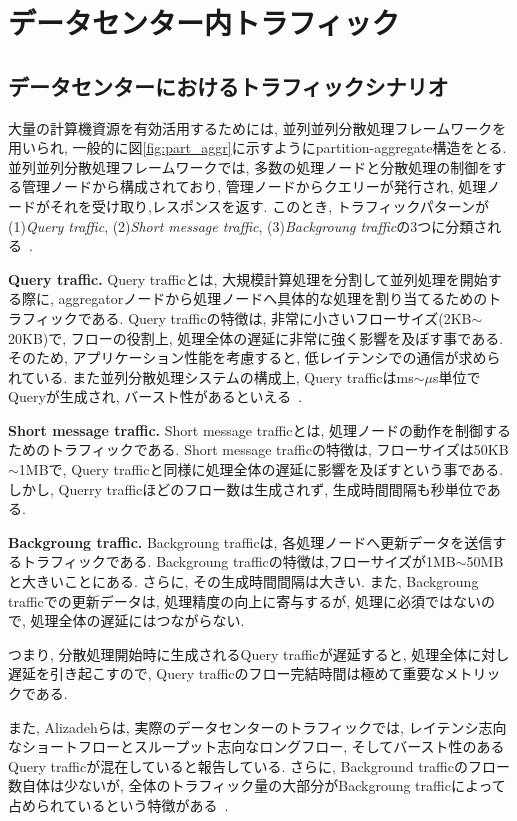 \documentclass[11pt, a4paper, twocolumn]{jsarticle}
\begin{document}
\section{データセンター内トラフィック}

\subsection{データセンターにおけるトラフィックシナリオ}
\label{sec:traffic_scenario}
大量の計算機資源を有効活用するためには,
並列並列分散処理フレームワークを用いられ, 一般的に図\ref{fig:part_aggr}に示すようにpartition-aggregate構造をとる.
並列並列分散処理フレームワークでは, 多数の処理ノードと分散処理の制御をする管理ノードから構成されており, 管理ノードからクエリーが発行され,
処理ノードがそれを受け取り,レスポンスを返す.
このとき, トラフィックパターンが  (1){\it Query traffic}, (2){\it Short message
traffic}, (3){\it Backgroung traffic}の3つに分類される~\cite{dctcp}.

{\bf Query traffic. }Query trafficとは, 大規模計算処理を分割して並列処理を開始する際に,
aggregatorノードから処理ノードへ具体的な処理を割り当てるためのトラフィックである.
Query trafficの特徴は, 非常に小さいフローサイズ(2KB$\sim$20KB)で,
フローの役割上, 処理全体の遅延に非常に強く影響を及ぼす事である.
そのため, アプリケーション性能を考慮すると, 低レイテンシでの通信が求められている.
また並列分散処理システムの構成上, Query trafficはms$\sim \mu$s単位でQueryが生成され,
バースト性があるといえる~\cite{dctcp}.

{\bf Short message traffic. } Short message trafficとは,
処理ノードの動作を制御するためのトラフィックである.
Short message trafficの特徴は, フローサイズは50KB$\sim$1MBで, Query
trafficと同様に処理全体の遅延に影響を及ぼすという事である.
しかし, Querry trafficほどのフロー数は生成されず, 生成時間間隔も秒単位である.

{\bf Backgroung traffic. }Backgroung trafficは,
各処理ノードへ更新データを送信するトラフィックである.
Backgroung trafficの特徴は,フローサイズが1MB$\sim$50MBと大きいことにある.
さらに, その生成時間間隔は大きい.
また, Backgroung trafficでの更新データは, 処理精度の向上に寄与するが, 処理に必須ではないので,
処理全体の遅延にはつながらない.

つまり, 分散処理開始時に生成されるQuery trafficが遅延すると,
処理全体に対し遅延を引き起こすので, Query trafficのフロー完結時間は極めて重要なメトリックである.

また, Alizadehらは, 実際のデータセンターのトラフィックでは, レイテンシ志向なショートフローとスループット志向なロングフロー,
そしてバースト性のあるQuery trafficが混在していると報告している.
さらに, Background trafficのフロー数自体は少ないが,
全体のトラフィック量の大部分がBackgroung trafficによって占められているという特徴がある~\cite{traffic}.
\end{document}
